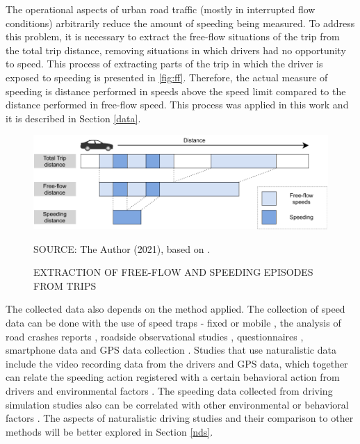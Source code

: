 The operational aspects of urban road traffic (mostly in interrupted flow conditions) arbitrarily reduce the amount of speeding being measured. To address this problem, it is necessary to extract the free-flow situations of the trip from the total trip distance, removing situations in which drivers had no opportunity to speed. This process of extracting parts of the trip in which the driver is exposed to speeding is presented in \autoref{fig:ff}. Therefore, the actual measure of speeding is distance performed in speeds above the speed limit compared to the distance performed in free-flow speed. This process was applied in this work and it is described in Section \ref{data}. 

\begin{figure}[!htbp]
    \centering\footnotesize
    \captionsetup{font=footnotesize}
    \caption{EXTRACTION OF FREE-FLOW AND SPEEDING EPISODES FROM TRIPS}
    \includegraphics{fig/richards.pdf}
    \label{fig:ff}
    \par SOURCE: The Author (2021), based on \textcite{Richard2013}.
\end{figure}

The collected data also depends on the method applied. The collection of speed data can be done with the use of speed traps - fixed or mobile \cite{Hidalgo-Solorzano2020, WHO2008}, the analysis of road crashes reports \cite{Watson2015}, roadside observational studies \cite{Shinar2017}, questionnaires \cite{Dinh2013}, smartphone data \cite{Warren2019} and GPS data collection \cite{Moreno2013, Wang2018}. Studies that use naturalistic data include the video recording data from the drivers and GPS data, which together can relate the speeding action registered with a certain behavioral action from drivers \cite{Bastos2020a} and environmental factors \cite{Moreno2013}. The speeding data collected from driving simulation studies also can be correlated with other environmental or behavioral factors \cite{Yadav2020}. The aspects of naturalistic driving studies and their comparison to other methods will be better explored in Section \ref{nds}. 

